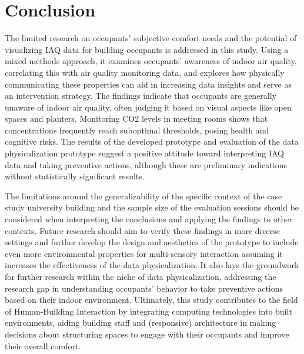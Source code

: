 \section{Conclusion}
\label{sec:conclusion}

The limited research on occupants' subjective comfort needs and the potential of visualizing IAQ data for building occupants is addressed in this study. Using a mixed-methods approach, it examines occupants' awareness of indoor air quality, correlating this with air quality monitoring data, and explores how physically communicating these properties can aid in increasing data insights and serve as an intervention strategy. The findings indicate that occupants are generally unaware of indoor air quality, often judging it based on visual aspects like open spaces and planters. Monitoring CO2 levels in meeting rooms shows that concentrations frequently reach suboptimal thresholds, posing health and cognitive risks.  The results of the developed prototype and evaluation of the data physicalization prototype suggest a positive attitude toward interpreting IAQ data and taking preventive actions, although these are preliminary indications without statistically significant results. 

The limitations around the generalizability of the specific context of the case study university building and the sample size of the evaluation sessions should be considered when interpreting the conclusions and applying the findings to other contexts. Future research should aim to verify these findings in more diverse settings and further develop the design and aesthetics of the prototype to include even more environmental properties for multi-sensory interaction assuming it increases the effectiveness of the data physicalization. It also lays the groundwork for further research within the niche of data physicalization, addressing the research gap in understanding occupants' behavior to take preventive actions based on their indoor environment. Ultimately, this study contributes to the field of Human-Building Interaction by integrating computing technologies into built environments, aiding building staff and (responsive) architecture in making decisions about structuring spaces to engage with their occupants and improve their overall comfort.
